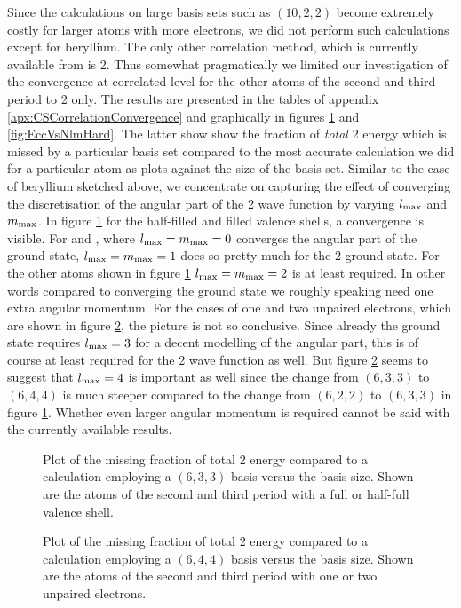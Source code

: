 Since the \FCI calculations on large basis sets such as $(10,2,2)$ become
extremely costly for larger atoms with more electrons,
we did not perform such calculations except for beryllium.
The only other correlation method,
which is currently available from \molsturm is {\MP}2.
Thus somewhat pragmatically we limited
our investigation of the convergence at correlated level
for the other atoms of the second and third period to {\MP}2 only.
The results are presented in the tables of appendix
\vref{apx:CSCorrelationConvergence} and graphically
in figures \ref{fig:EccVsNlmEasy} and \vref{fig:EccVsNlmHard}.
The latter show show the fraction of \emph{total} {\MP}2 energy
which is missed by a particular basis set compared to the most
accurate calculation we did for a particular atom
as plots against the size of the basis set.
Similar to the case of beryllium sketched above,
we concentrate on capturing the effect of converging the discretisation
of the angular part of the {\MP}2 wave function
by varying $l_\text{max}$ and $m_\text{max}$.
In figure \ref{fig:EccVsNlmEasy} for the half-filled
and filled valence shells,
a convergence is visible.
For  and ,
where $l_\text{max} = m_\text{max} = 0$ converges the angular part of the \HF ground state,
$l_\text{max} = m_\text{max} = 1$ does so pretty much for the {\MP}2 ground state.
For the other atoms shown in figure \ref{fig:EccVsNlmEasy} $l_\text{max} = m_\text{max} = 2$
is at least required.
In other words compared to converging the \HF ground state
we roughly speaking need one extra angular momentum.
For the cases of one and two unpaired electrons,
which are shown in figure \ref{fig:EccVsNlmHard},
the picture is not so conclusive.
Since already the \HF ground state requires $l_\text{max} = 3$
for a decent modelling of the angular part,
this is of course at least required for the {\MP}2 wave function as well.
But figure \ref{fig:EccVsNlmHard} seems to suggest
that $l_\text{max} = 4$ is important as well
since the change from $(6,3,3)$ to $(6,4,4)$ is much
steeper compared to the change from $(6,2,2)$ to $(6,3,3)$ in figure \ref{fig:EccVsNlmEasy}.
Whether even larger angular momentum is required cannot be said
with the currently available results.

\begin{figure}
	\centering
	\caption[
		Missing fraction of {\MP}2 energy versus \CS basis size
	]{
		Plot of the
		missing fraction of total {\MP}2 energy
		compared to a calculation employing a $(6,3,3)$ \CS basis
		versus the basis size.
		Shown are the atoms of the second and third period
		with a full or half-full valence shell.
	}
	\label{fig:EccVsNlmEasy}
\end{figure}
\begin{figure}
	\centering
	\caption[
		Missing fraction of {\MP}2 energy versus \CS basis size (plot 2)
	]{
		Plot of the
		missing fraction of total {\MP}2 energy
		compared to a calculation employing a $(6,4,4)$ \CS basis
		versus the basis size.
		Shown are the atoms of the second and third period
		with one or two unpaired electrons.
	}
	\label{fig:EccVsNlmHard}
\end{figure}

